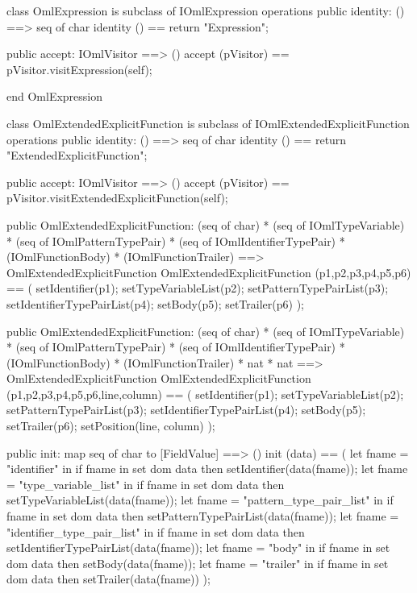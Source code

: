\begin{vdm_al}
class OmlExpression is subclass of IOmlExpression
operations
  public identity: () ==> seq of char
  identity () == return "Expression";

  public accept: IOmlVisitor ==> ()
  accept (pVisitor) == pVisitor.visitExpression(self);

end OmlExpression
\end{vdm_al}
\begin{vdm_al}
class OmlExtendedExplicitFunction is subclass of IOmlExtendedExplicitFunction
operations
  public identity: () ==> seq of char
  identity () == return "ExtendedExplicitFunction";

  public accept: IOmlVisitor ==> ()
  accept (pVisitor) == pVisitor.visitExtendedExplicitFunction(self);

  public OmlExtendedExplicitFunction:
    (seq of char) *
    (seq of IOmlTypeVariable) *
    (seq of IOmlPatternTypePair) *
    (seq of IOmlIdentifierTypePair) *
    (IOmlFunctionBody) *
    (IOmlFunctionTrailer) ==> OmlExtendedExplicitFunction
  OmlExtendedExplicitFunction (p1,p2,p3,p4,p5,p6) == 
    ( setIdentifier(p1);
      setTypeVariableList(p2);
      setPatternTypePairList(p3);
      setIdentifierTypePairList(p4);
      setBody(p5);
      setTrailer(p6) );

  public OmlExtendedExplicitFunction:
    (seq of char) *
    (seq of IOmlTypeVariable) *
    (seq of IOmlPatternTypePair) *
    (seq of IOmlIdentifierTypePair) *
    (IOmlFunctionBody) *
    (IOmlFunctionTrailer) *
    nat *
    nat ==> OmlExtendedExplicitFunction
  OmlExtendedExplicitFunction (p1,p2,p3,p4,p5,p6,line,column) == 
    ( setIdentifier(p1);
      setTypeVariableList(p2);
      setPatternTypePairList(p3);
      setIdentifierTypePairList(p4);
      setBody(p5);
      setTrailer(p6);
      setPosition(line, column) );

  public init: map seq of char to [FieldValue] ==> ()
  init (data) ==
    ( let fname = "identifier" in
        if fname in set dom data
        then setIdentifier(data(fname));
      let fname = "type_variable_list" in
        if fname in set dom data
        then setTypeVariableList(data(fname));
      let fname = "pattern_type_pair_list" in
        if fname in set dom data
        then setPatternTypePairList(data(fname));
      let fname = "identifier_type_pair_list" in
        if fname in set dom data
        then setIdentifierTypePairList(data(fname));
      let fname = "body" in
        if fname in set dom data
        then setBody(data(fname));
      let fname = "trailer" in
        if fname in set dom data
        then setTrailer(data(fname)) );


\end{vdm_al}

